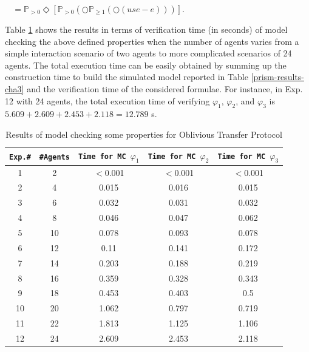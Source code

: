 $~~~~= \mathbb{P}_{>0}\Diamond [\mathbb{P}_{>0}(\bigcirc\mathbb{P}_{\geq1}(\bigcirc(use-e)))]$.

\noindent Table \ref{formulae-prism-results-chap3} shows the results in terms of verification time (in seconds) of model checking the above defined properties when the number of agents
varies from a simple interaction scenario of two agents to more
complicated scenarios of 24 agents. The total execution time can
be easily obtained by summing up the construction time to build
the simulated model reported in Table \ref{prism-results-cha3} and the
verification time of the considered formulae. For instance, in
Exp. 12 with 24 agents, the total execution time of verifying
$\varphi_1$, $\varphi_2$, and $\varphi_3$ is $5.609 + 2.609 +
2.453 + 2.118 = 12.789$ s.

\begin{table}%
\centering \caption{Results of model checking some properties for Oblivious Transfer Protocol} \label{formulae-prism-results-chap3}
\begin{tabular}{|c|c|c|c|c|}
\hline
\texttt{Exp.\#} &   \texttt{\#Agents}    & \texttt{Time for MC $\varphi_1$} & \texttt{Time for MC $\varphi_2$} &  \texttt{Time for MC $\varphi_3$} \\
\hline\hline
1                &2           &$<$0.001      &$<$0.001      &$<$0.001       \\
\hline
2                &4           &0.015      &0.016      &0.015       \\
\hline
3                &6           &0.032      &0.031      &0.032       \\
\hline
4                &8           &0.046      &0.047      &0.062       \\
\hline
5                &10          &0.078      &0.093      &0.078       \\
\hline
6                &12          &0.11       &0.141      &0.172       \\
\hline
7                &14          &0.203      &0.188      &0.219       \\
\hline
8                &16          &0.359      &0.328      &0.343       \\
\hline
9                &18          &0.453      &0.403      &0.5       \\
\hline
10               &20          &1.062      &0.797      &0.719       \\
\hline
11               &22          &1.813      &1.125      &1.106       \\
\hline
12               &24          &2.609      &2.453      &2.118       \\
\hline

\end{tabular}
\end{table}

